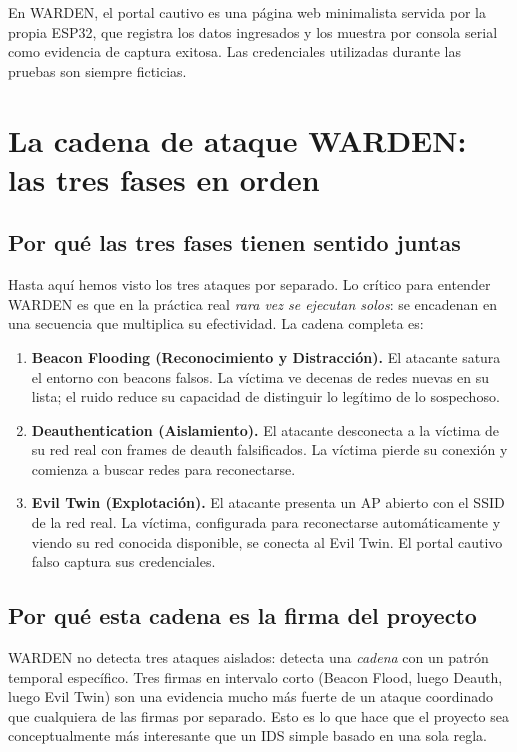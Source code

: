 \documentclass[11pt,a4paper]{article}
\begin{document}
En WARDEN, el portal cautivo es una página web minimalista servida por la
propia ESP32, que registra los datos ingresados y los muestra por consola
serial como evidencia de captura exitosa. Las credenciales utilizadas
durante las pruebas son siempre ficticias.

\section{La cadena de ataque WARDEN: las tres fases en orden}

\subsection{Por qué las tres fases tienen sentido juntas}
Hasta aquí hemos visto los tres ataques por separado. Lo crítico para
entender WARDEN es que en la práctica real \emph{rara vez se ejecutan
solos}: se encadenan en una secuencia que multiplica su efectividad. La
cadena completa es:

\begin{enumerate}
  \item \textbf{Beacon Flooding (Reconocimiento y Distracción).} El
    atacante satura el entorno con beacons falsos. La víctima ve
    decenas de redes nuevas en su lista; el ruido reduce su capacidad de
    distinguir lo legítimo de lo sospechoso.
  \item \textbf{Deauthentication (Aislamiento).} El atacante desconecta a
    la víctima de su red real con frames de deauth falsificados. La
    víctima pierde su conexión y comienza a buscar redes para
    reconectarse.
  \item \textbf{Evil Twin (Explotación).} El atacante presenta un AP
    abierto con el SSID de la red real. La víctima, configurada para
    reconectarse automáticamente y viendo su red conocida disponible, se
    conecta al Evil Twin. El portal cautivo falso captura sus
    credenciales.
\end{enumerate}

\subsection{Por qué esta cadena es la firma del proyecto}
WARDEN no detecta tres ataques aislados: detecta una \emph{cadena} con un
patrón temporal específico. Tres firmas en intervalo corto (Beacon Flood,
luego Deauth, luego Evil Twin) son una evidencia mucho más fuerte de un
ataque coordinado que cualquiera de las firmas por separado. Esto es lo
que hace que el proyecto sea conceptualmente más interesante que un IDS
simple basado en una sola regla.
\end{document}
